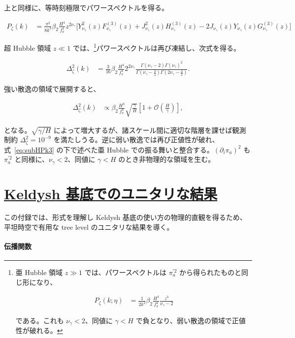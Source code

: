 \documentclass[a4paper,11pt]{ltjsarticle}
\newcommand{\sectionlink}[1]{\section[#1]{\hyperlink{toc}{#1}}}
\numberwithin{equation}{section}
\def\pia{\pi_{a}}
\newcommand{\Eq}[1]{Eq.~(\ref{#1})}
\renewcommand{\Eq}[1]{式~\eqref{#1}}
\begin{document}
上と同様に、等時刻極限でパワースペクトルを得る。

\begin{align}
P_\zeta(k) &= \frac{\pi^2}{8 k^3} \beta_2 \frac{H^4}{f_\pi^4}z^{2\nu_\gamma} \Big[ Y^2_{\nu_\gamma}(z)  F^{(3)}_{\nu_\gamma}(z) + J^2_{\nu_\gamma}(z) H^{(3)}_{\nu_\gamma}(z) -2J_{\nu_\gamma}(z)Y_{\nu_\gamma}(z) G^{(3)}_{\nu_\gamma}(z) \Big]
\end{align}

超 Hubble 領域 $z\ll1$ では、\footnote{亜 Hubble 領域 $z\gg1$ では、パワースペクトルは $\pia^{\prime2}$ から得られたものと同じ形になり、

\begin{align}\label{eq:subHPk3}
    P_\zeta(k;\eta) &=   \frac{1}{2k^3} \beta_2\frac{H^4}{f_\pi^4} \frac{z^3}{\nu_\gamma-2} 
\end{align}

である。これも $\nu_\gamma<2$、同値に $\gamma<H$ で負となり、弱い散逸の領域で正値性が破れる。}パワースペクトルは再び凍結し、次式を得る。

\begin{align}
\Delta^2_\zeta(k) &=  \frac{3}{16} \beta_2\frac{H^4}{f_\pi^4} 2^{2\nu_\gamma} \frac{\Gamma\left(\nu_\gamma-2\right)\Gamma\left(\nu_\gamma\right)^2}{\Gamma\left(\nu_\gamma - \frac{3}{2}\right)\Gamma\left(2\nu_\gamma - \frac{3}{2}\right)}. \label{eq:PK3SH}
\end{align}

強い散逸の領域で展開すると、

\begin{align}
    \Delta^2_\zeta(k)  &\propto \beta_2 \frac{H^4}{f_\pi^4}  \sqrt{\frac{\gamma}{H}} \left[1 + \mathcal{O}\left(\frac{H}{\gamma}\right) \right],
\end{align}

となる。$\sqrt{\gamma/H}$ によって増大するが、諸スケール間に適切な階層を課せば観測制約 $\Delta_\zeta^2=10^{-9}$ を満たしうる。逆に弱い散逸では再び正値性が破れ、\Eq{eq:subHPk3} の下で述べた亜 Hubble での振る舞いと整合する。$(\partial_i\pia)^2$ も $\pia^{\prime2}$ と同様に、$\nu_\gamma<2$、同値に $\gamma<H$ のとき非物理的な領域を生む。

\sectionlink{Keldysh 基底でのユニタリな結果}\label{app:unit}

この付録では、形式を理解し Keldysh 基底の使い方の物理的直観を得るため、平坦時空で有用な tree level のユニタリな結果を導く。

\paragraph{伝播関数}
\end{document}

